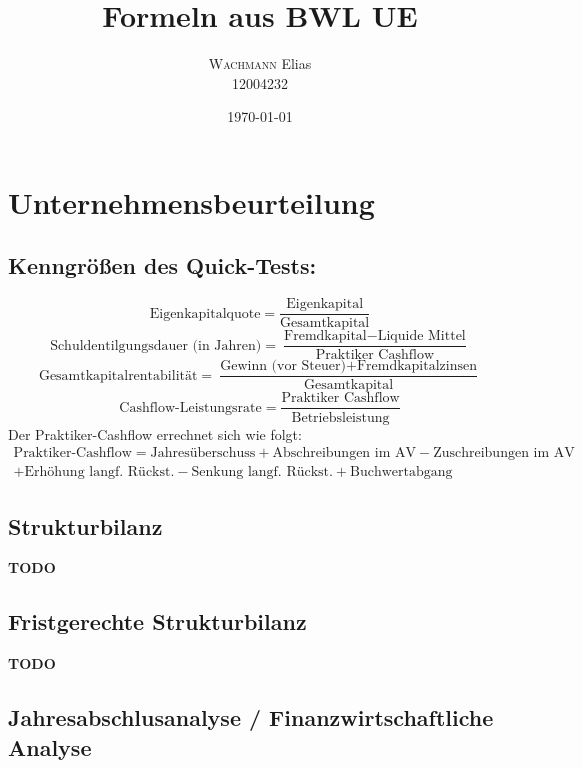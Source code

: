 \documentclass[11pt]{scrartcl}
\begin{document}
\title{Formeln aus BWL UE}
\author{\textsc{Wachmann} Elias\\12004232}
\date{\today}
\maketitle

\tableofcontents
\newpage
\section{Unternehmensbeurteilung}
\subsection{Kenngrößen des Quick-Tests:}

\begin{equation}
    \text{Eigenkapitalquote} = \frac{\text{Eigenkapital}}{\text{Gesamtkapital}}
\end{equation}
\begin{equation}
    \text{Schuldentilgungsdauer (in Jahren)} = \frac{\text{Fremdkapital} - \text{Liquide Mittel}}{\text{Praktiker Cashflow}}
\end{equation}
\begin{equation}
    \text{Gesamtkapitalrentabilität} = \frac{\text{Gewinn (vor Steuer)} + \text{Fremdkapitalzinsen}}{\text{Gesamtkapital}}
\end{equation}
\begin{equation}
    \text{Cashflow-Leistungsrate} = \frac{\text{Praktiker Cashflow}}{\text{Betriebsleistung}} 
\end{equation}
Der Praktiker-Cashflow errechnet sich wie folgt: 
\begin{multline*}
    \text{Praktiker-Cashflow} = \text{Jahresüberschuss} +\text{Abschreibungen im AV} - \text{Zuschreibungen im AV}\\ + \text{Erhöhung langf. Rückst.} - \text{Senkung langf. Rückst.} + \text{Buchwertabgang}
\end{multline*}
\subsection{Strukturbilanz}
\textbf{TODO}
\subsection{Fristgerechte Strukturbilanz}
\textbf{TODO}
\subsection{Jahresabschlusanalyse / Finanzwirtschaftliche Analyse}
\end{document}
